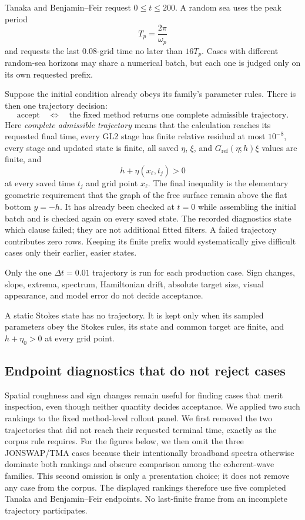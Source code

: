 \documentclass[10pt]{article}
\newcommand{\Gref}{G_{\mathrm{ref}}}
\begin{document}
Tanaka and Benjamin--Feir request $0\leq t\leq200$.  A random sea uses the
peak period
\[
  T_p=\frac{2\pi}{\omega_p}
\]
and requests the last $0.08$-grid time no later than $16T_p$.  Cases with
different random-sea horizons may share a numerical batch, but each one is
judged only on its own requested prefix.

Suppose the initial condition already obeys its family's parameter rules.
There is then one trajectory decision:
\begin{equation}
  \boxed{\text{accept}
    \quad\Longleftrightarrow\quad
    \text{the fixed method returns one complete admissible trajectory}.}
  \label{eq:trajectory-acceptance}
\end{equation}
Here \emph{complete admissible trajectory} means that the calculation reaches
its requested final time, every GL2 stage has finite relative residual at
most \(10^{-8}\), every stage and updated state is finite, all saved
\(\eta\), \(\xi\), and \(\Gref(\eta;h)\xi\) values are finite, and
\[
  h+\eta(x_\ell,t_j)>0
\]
at every saved time \(t_j\) and grid point \(x_\ell\).  The final inequality
is the elementary geometric requirement that the graph of the free surface
remain above the flat bottom \(y=-h\).  It has already been checked at
\(t=0\) while assembling the initial batch and is checked again on every
saved state.  The recorded diagnostics state which clause failed; they are
not additional fitted filters.  A failed trajectory
contributes zero rows.  Keeping its finite prefix would systematically give
difficult cases only their earlier, easier states.

Only the one $\Delta t=0.01$ trajectory is run for each production case.
Sign changes, slope, extrema, spectrum, Hamiltonian drift, absolute target
size, visual appearance, and model error do not decide acceptance.

A static Stokes state has no trajectory.  It is kept only when its sampled
parameters obey the Stokes rules, its state and common target are finite, and
$h+\eta_0>0$ at every grid point.

\subsection{Endpoint diagnostics that do not reject cases}
\label{sec:endpoint-diagnostics}

Spatial roughness and sign changes remain useful for finding cases that merit
inspection, even though neither quantity decides acceptance.  We applied two
such rankings to the fixed method-level rollout panel.  We first removed the
two trajectories that did not reach their requested terminal time, exactly as
the corpus rule requires.  For the figures below, we then omit the three
JONSWAP/TMA cases because their intentionally broadband spectra otherwise
dominate both rankings and obscure comparison among the coherent-wave
families.  This second omission is only a presentation choice; it does not
remove any case from the corpus.  The displayed rankings therefore use five
completed Tanaka and Benjamin--Feir endpoints.  No last-finite frame from an
incomplete trajectory participates.
\end{document}
